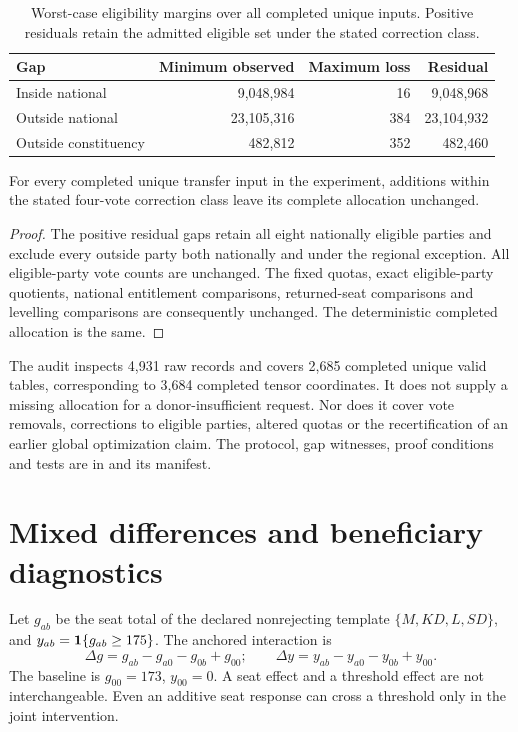 \begin{table}[htbp]\centering
\caption{Worst-case eligibility margins over all completed unique inputs. Positive residuals retain the admitted eligible set under the stated correction class.}
\begin{tabular}{lrrr}
\toprule
Gap & Minimum observed & Maximum loss & Residual\\
\midrule
Inside national & 9,048,984 & 16 & 9,048,968\\
Outside national & 23,105,316 & 384 & 23,104,932\\
Outside constituency & 482,812 & 352 & 482,460\\
\bottomrule
\end{tabular}
\end{table}

\begin{proposition}\label{prop:correction}
For every completed unique transfer input in the experiment, additions within the stated four-vote correction class leave its complete allocation unchanged.
\end{proposition}
\begin{proof}
The positive residual gaps retain all eight nationally eligible parties and exclude every outside party both nationally and under the regional exception. All eligible-party vote counts are unchanged. The fixed quotas, exact eligible-party quotients, national entitlement comparisons, returned-seat comparisons and levelling comparisons are consequently unchanged. The deterministic completed allocation is the same.
\end{proof}

The audit inspects 4,931 raw records and covers 2,685 completed unique valid tables, corresponding to 3,684 completed tensor coordinates. It does not supply a missing allocation for a donor-insufficient request. Nor does it cover vote removals, corrections to eligible parties, altered quotas or the recertification of an earlier global optimization claim. The protocol, gap witnesses, proof conditions and tests are in  and its manifest.

\section{Mixed differences and beneficiary diagnostics}

Let \(g_{ab}\) be the seat total of the declared nonrejecting template \(\{M,KD,L,SD\}\), and \(y_{ab}=\mathbf{1}\{g_{ab}\ge175\}\). The anchored interaction is
\[
\Delta g=g_{ab}-g_{a0}-g_{0b}+g_{00};
\qquad
\Delta y=y_{ab}-y_{a0}-y_{0b}+y_{00}.
\]
The baseline is \(g_{00}=173\), \(y_{00}=0\). A seat effect and a threshold effect are not interchangeable. Even an additive seat response can cross a threshold only in the joint intervention.

